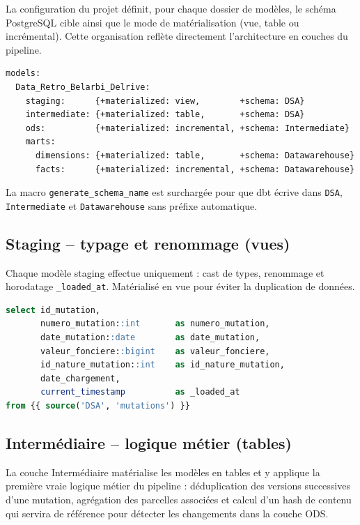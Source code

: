 \documentclass[12pt,a4paper]{article}
\newcommand{\sql}[1]{\texttt{\small #1}}
\begin{document}
La configuration du projet définit, pour chaque dossier de modèles, le
schéma PostgreSQL cible ainsi que le mode de matérialisation (vue, table ou
incrémental). Cette organisation reflète directement l'architecture en
couches du pipeline.

\vspace{2.5em}


\begin{lstlisting}[language=Jinja]
models:
  Data_Retro_Belarbi_Delrive:
    staging:      {+materialized: view,        +schema: DSA}
    intermediate: {+materialized: table,       +schema: DSA}
    ods:          {+materialized: incremental, +schema: Intermediate}
    marts:
      dimensions: {+materialized: table,       +schema: Datawarehouse}
      facts:      {+materialized: incremental, +schema: Datawarehouse}
\end{lstlisting}

La macro \texttt{generate\_schema\_name} est surchargée pour que dbt écrive
dans \texttt{DSA}, \texttt{Intermediate} et \texttt{Datawarehouse} sans
préfixe automatique.

\subsection{Staging -- typage et renommage (vues)}

Chaque modèle staging effectue uniquement : cast de types, renommage et
horodatage \sql{\_loaded\_at}. Matérialisé en vue pour éviter la
duplication de données.

\vspace{2.5em}

\begin{lstlisting}[language=SQL, caption={stg\_mutations.sql}]
select id_mutation,
       numero_mutation::int       as numero_mutation,
       date_mutation::date        as date_mutation,
       valeur_fonciere::bigint    as valeur_fonciere,
       id_nature_mutation::int    as id_nature_mutation,
       date_chargement,
       current_timestamp          as _loaded_at
from {{ source('DSA', 'mutations') }}
\end{lstlisting}

\subsection{Intermédiaire -- logique métier (tables)}

La couche Intermédiaire matérialise les modèles en tables et y applique la
première vraie logique métier du pipeline : déduplication des versions
successives d'une mutation, agrégation des parcelles associées et calcul
d'un hash de contenu qui servira de référence pour détecter les changements
dans la couche ODS.
\end{document}
